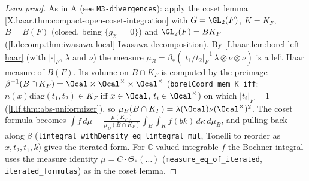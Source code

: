 \begin{proof}[Lean proof]
As in A (see \texttt{M3-divergences}): apply the coset lemma \cref{X.haar.thm:compact-open-coset-integration} with $G=\GL_2(F)$, $K=K_F$, $B=B(F)$ (closed, being $\{g_{21}=0\}$) and $\GL_2(F)=BK_F$ (\cref{I.decomp.thm:iwasawa-local} Iwasawa decomposition). By \cref{I.haar.lem:borel-left-haar} (with $|\cdot|_F$, $\lambda$ and $\nu$) the measure $\mu_B=\beta_*(|t_1/t_2|_F^{-1}\,\lambda\otimes\nu\otimes\nu)$ is a left Haar measure of $B(F)$. Its volume on $B\cap K_F$ is computed by the preimage $\beta^{-1}(B\cap K_F)=\Ocal\times\Ocal^\times\times\Ocal^\times$ (\texttt{borelCoord\_mem\_K\_iff}: $n(x)\mathrm{diag}(t_1,t_2)\in K_F$ iff $x\in\Ocal$, $t_i\in\Ocal^\times$) on which $|t_i|_F=1$ (\cref{I.lf.thm:abs-uniformizer}), so $\mu_B(B\cap K_F)=\lambda(\Ocal)\nu(\Ocal^\times)^2$. The coset formula becomes $\int f\,d\mu=\frac{\mu(K_F)}{\mu_B(B\cap K_F)}\int_B\int_Kf(bk)\,d\kappa\,d\mu_B$, and pulling back along $\beta$ (\texttt{lintegral\_withDensity\_eq\_lintegral\_mul}, Tonelli to reorder as $x,t_2,t_1,k$) gives the iterated form. For $\mathbb C$-valued integrable $f$ the Bochner integral uses the measure identity $\mu=C\cdot\Theta_*(\ldots)$ (\texttt{measure\_eq\_of\_iterated}, \texttt{iterated\_formulas}) as in the coset lemma.
\end{proof}

